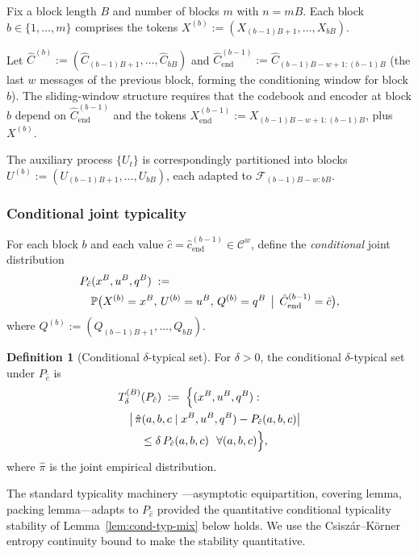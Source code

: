 \documentclass[11pt]{article}
\newcommand{\Prob}{\mathbb{P}}
\newcommand{\F}{\mathcal{F}}
\theoremstyle{plain}
\theoremstyle{definition}
\newtheorem{definition}[theorem]{Definition}
\theoremstyle{remark}
\begin{document}
Fix a block length $B$ and number of blocks $m$ with $n = mB$. Each
block $b \in \{1, \ldots, m\}$ comprises the tokens
$X^{(b)} := (X_{(b-1)B+1}, \ldots, X_{bB})$.

Let $\hat{C}^{(b)} := (\hat{C}_{(b-1)B+1}, \ldots, \hat{C}_{bB})$ and
$\hat{C}^{(b-1)}_{\mathrm{end}} := \hat{C}_{(b-1)B-w+1:(b-1)B}$
(the last $w$ messages of the previous block, forming the conditioning
window for block $b$). The sliding-window structure requires that
the codebook and encoder at block $b$ depend on $\hat{C}^{(b-1)}_{\mathrm{end}}$
and the tokens $X^{(b-1)}_{\mathrm{end}} := X_{(b-1)B-w+1:(b-1)B}$, plus
$X^{(b)}$.

The auxiliary process $\{U_t\}$ is correspondingly partitioned into
blocks $U^{(b)} := (U_{(b-1)B+1}, \ldots, U_{bB})$, each adapted to
$\F_{(b-1)B-w:bB}$.

\subsubsection{Conditional joint typicality}

For each block $b$ and each value
$\hat{c} = \hat{c}^{(b-1)}_{\mathrm{end}} \in \mathcal{C}^w$, define the
\emph{conditional} joint distribution
\[
\begin{split}
&P_{\hat{c}}(x^B, u^B, q^B) \;:=\;\\
&\quad \Prob\bigl(X^{(b)} = x^B,\, U^{(b)} = u^B,\, Q^{(b)} = q^B \,\bigm|\, \hat{C}^{(b-1)}_{\mathrm{end}} = \hat{c}\bigr),
\end{split}
\]
where $Q^{(b)} := (Q_{(b-1)B+1}, \ldots, Q_{bB})$.

\begin{definition}[Conditional $\delta$-typical set]\label{def:cond-typ}
For $\delta > 0$, the conditional $\delta$-typical set under $P_{\hat c}$ is
\[
\begin{aligned}
&T_\delta^{(B)}(P_{\hat c})
\;:=\; \Bigl\{ (x^B, u^B, q^B) :\ \\
&\quad \bigl|\,\hat\pi(a, b, c \mid x^B, u^B, q^B) - P_{\hat c}(a, b, c)\bigr| \\
&\quad\quad \leq \delta\, P_{\hat c}(a, b, c)\ \ \forall (a,b,c) \Bigr\},
\end{aligned}
\]
where $\hat\pi$ is the joint empirical distribution.
\end{definition}

The standard typicality machinery
\citep[Ch.~2]{elgamal2011network}---asymptotic equipartition,
covering lemma, packing lemma---adapts to $P_{\hat c}$ provided the
quantitative conditional typicality stability of
Lemma~\ref{lem:cond-typ-mix} below holds. We use the Csisz\'ar--K\"orner
entropy continuity bound to make the stability quantitative.
\end{document}
